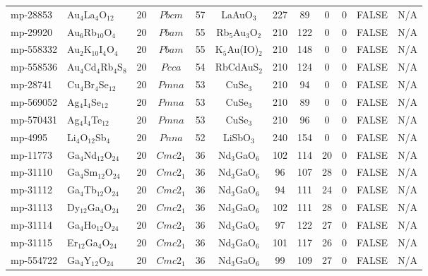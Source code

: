 {\begin{longtable}{llcccccccccc}
    mp-28853 & Au$_{4}$La$_{4}$O$_{12}$ & 20    & $Pbcm$ & 57    & LaAuO$_{3}$ & 227   & 89    & 0     & 0     & FALSE & N/A \\
    mp-29920 & Au$_{6}$Rb$_{10}$O$_{4}$ & 20    & $Pbam$ & 55    & Rb$_{5}$Au$_{3}$O$_{2}$ & 210   & 122   & 0     & 0     & FALSE & N/A \\
    mp-558332 & Au$_{2}$K$_{10}$I$_{4}$O$_{4}$ & 20    & $Pbam$ & 55    & K$_{5}$Au(IO)$_{2}$ & 210   & 148   & 0     & 0     & FALSE & N/A \\
    mp-558536 & Au$_{4}$Cd$_{4}$Rb$_{4}$S$_{8}$ & 20    & $Pcca$ & 54    & RbCdAuS$_{2}$ & 210   & 124   & 0     & 0     & FALSE & N/A \\
    mp-28741 & Cu$_{4}$Br$_{4}$Se$_{12}$ & 20    & $Pmna$ & 53    & CuSe$_{3}$ & 210   & 94    & 0     & 0     & FALSE & N/A \\
    mp-569052 & Ag$_{4}$I$_{4}$Se$_{12}$ & 20    & $Pmna$ & 53    & CuSe$_{3}$ & 210   & 89    & 0     & 0     & FALSE & N/A \\
    mp-570431 & Ag$_{4}$I$_{4}$Te$_{12}$ & 20    & $Pmna$ & 53    & CuSe$_{3}$ & 210   & 96    & 0     & 0     & FALSE & N/A \\
    mp-4995 & Li$_{4}$O$_{12}$Sb$_{4}$ & 20    & $Pnna$ & 52    & LiSbO$_{3}$ & 240   & 154   & 0     & 0     & FALSE & N/A \\
    mp-11773 & Ga$_{4}$Nd$_{12}$O$_{24}$ & 20    & $Cmc2_1$ & 36    & Nd$_{3}$GaO$_{6}$ & 102   & 114   & 20    & 0     & FALSE & N/A \\
    mp-31110 & Ga$_{4}$Sm$_{12}$O$_{24}$ & 20    & $Cmc2_1$ & 36    & Nd$_{3}$GaO$_{6}$ & 96    & 107   & 28    & 0     & FALSE & N/A \\
    mp-31112 & Ga$_{4}$Tb$_{12}$O$_{24}$ & 20    & $Cmc2_1$ & 36    & Nd$_{3}$GaO$_{6}$ & 94    & 111   & 24    & 0     & FALSE & N/A \\
    mp-31113 & Dy$_{12}$Ga$_{4}$O$_{24}$ & 20    & $Cmc2_1$ & 36    & Nd$_{3}$GaO$_{6}$ & 102   & 111   & 28    & 0     & FALSE & N/A \\
    mp-31114 & Ga$_{4}$Ho$_{12}$O$_{24}$ & 20    & $Cmc2_1$ & 36    & Nd$_{3}$GaO$_{6}$ & 97    & 122   & 27    & 0     & FALSE & N/A \\
    mp-31115 & Er$_{12}$Ga$_{4}$O$_{24}$ & 20    & $Cmc2_1$ & 36    & Nd$_{3}$GaO$_{6}$ & 101   & 117   & 26    & 0     & FALSE & N/A \\
    mp-554722 & Ga$_{4}$Y$_{12}$O$_{24}$ & 20    & $Cmc2_1$ & 36    & Nd$_{3}$GaO$_{6}$ & 99    & 109   & 27    & 0     & FALSE & N/A \\

\end{longtable}}
